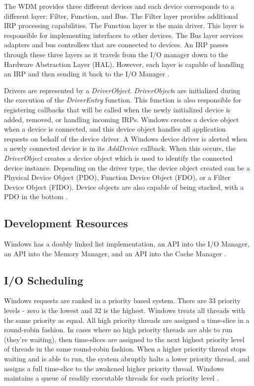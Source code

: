 \documentclass[onecolumn,draftclsnofoot, 10pt, compsoc]{IEEEtran}
\begin{document}
		The WDM provides three different devices and  each device corresponds to a different layer: Filter, Function, and Bus.
		The Filter layer provides additional IRP processing capabilities.
		The Function layer is the main driver. This layer is responsible for implementing interfaces to other devices.
		The Bus layer services adapters and bus controllers that are connected to devices.
		An IRP passes through these three layers as it travels from the I/O manager down to the Hardware Abstraction Layer (HAL).
		However, each layer is capable of handling an IRP and then sending it back to the I/O Manager \cite{windowsDevs}.
		
		Drivers are represented by a \textit{DriverObject}.
		\textit{DriverObject}s are initialized during the execution of the \textit{DriverEntry} function. 
		This function is also responsible for registering callbacks that will be called when the newly initialized device is added, removed, or handling incoming IRPs. 
		Windows creates a device object when a device is connected, and this device object handles all application requests on behalf of the device driver.
		A Windows device driver is alerted when a newly connected device is in its \textit{AddDevice} callback.
		When this occurs, the \textit{DriverObject} creates a device object which is used to identify the connected device instance. 
		Depending on the driver type, the device object created can be a Physical Device Object (PDO), Function Device Object (FDO), or a Filter Device Object (FIDO). 
		Device objects are also capable of being stacked, with a PDO in the bottom \cite{windowsDevs}.
	
		\subsection{Development Resources}
			Windows has a doubly linked list implementation, an API into the I/O Manager, an API into the Memory Manager, and an API into the Cache Manager \cite{windowsResources}.
			
	\subsection{I/O Scheduling}
		Windows requests are ranked in a priority based system. 
		There are 33 priority levels - zero is the lowest and 32 is the highest. 
		Windows treats all threads with the same priority as equal.
		All high priority threads are assigned a time-slice in a round-robin fashion. 
		In cases where no high priority threads are able to run (they're waiting), then time-slices are assigned to the next highest priority level of threads in the same round-robin fashion.
		When a higher priority thread stops waiting and is able to run, the system abruptly halts a lower priority thread, and assigns a full time-slice to the awakened higher priority thread.
		Windows maintains a queue of readily executable threads for each priority level \cite{windowsSched}.
\end{document}
